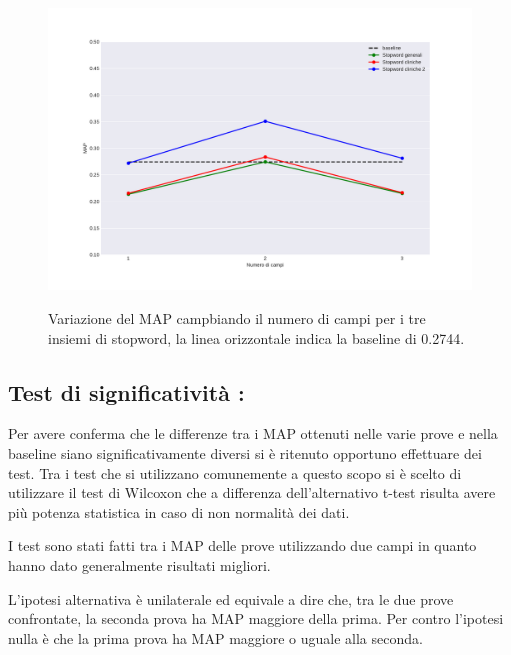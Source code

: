 \documentclass[runningheads]{llncs}
\begin{document}
\begin{figure}%
    \centering
    {{\includegraphics[width=1\linewidth]{maps} }}%
    \caption{Variazione del MAP campbiando il numero di campi per i tre insiemi di stopword, la linea orizzontale indica la baseline di 0.2744.}%
\end{figure}


\subsection{Test di significativit\`a :}
Per avere conferma che le differenze tra i MAP ottenuti nelle varie prove e nella baseline
siano significativamente diversi si \`e ritenuto opportuno effettuare dei test.
Tra i test che si utilizzano comunemente a questo scopo si \`e scelto di utilizzare il
test di Wilcoxon che a differenza dell'alternativo t-test risulta avere pi\`u
potenza statistica in caso di non normalit\`a dei dati.

I test sono stati fatti tra i MAP delle prove utilizzando due campi in quanto hanno
dato generalmente risultati migliori.

L'ipotesi alternativa \`e unilaterale ed equivale a dire che, tra le due prove
confrontate, la seconda prova ha MAP maggiore della prima.
Per contro l'ipotesi nulla \`e che la prima prova ha MAP maggiore o uguale alla seconda.
\end{document}
